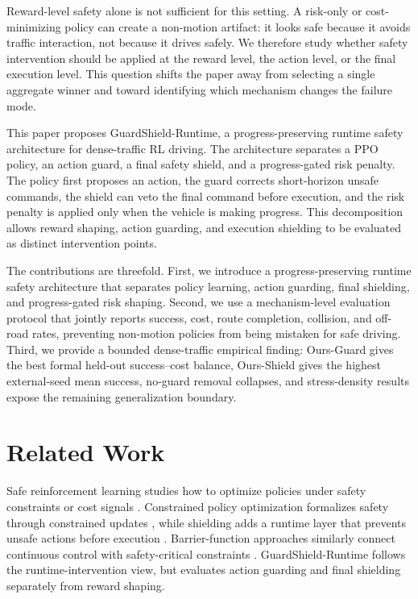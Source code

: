 \documentclass[conference,a4paper]{IEEEtran}
\newcommand{\method}{GuardShield-Runtime}
\begin{document}
Reward-level safety alone is not sufficient for this setting. A risk-only or cost-minimizing policy can create a non-motion artifact: it looks safe because it avoids traffic interaction, not because it drives safely. We therefore study whether safety intervention should be applied at the reward level, the action level, or the final execution level. This question shifts the paper away from selecting a single aggregate winner and toward identifying which mechanism changes the failure mode.

This paper proposes \method{}, a progress-preserving runtime safety architecture for dense-traffic RL driving. The architecture separates a PPO policy, an action guard, a final safety shield, and a progress-gated risk penalty. The policy first proposes an action, the guard corrects short-horizon unsafe commands, the shield can veto the final command before execution, and the risk penalty is applied only when the vehicle is making progress. This decomposition allows reward shaping, action guarding, and execution shielding to be evaluated as distinct intervention points.

The contributions are threefold. First, we introduce a progress-preserving runtime safety architecture that separates policy learning, action guarding, final shielding, and progress-gated risk shaping. Second, we use a mechanism-level evaluation protocol that jointly reports success, cost, route completion, collision, and off-road rates, preventing non-motion policies from being mistaken for safe driving. Third, we provide a bounded dense-traffic empirical finding: Ours-Guard gives the best formal held-out success--cost balance, Ours-Shield gives the highest external-seed mean success, no-guard removal collapses, and stress-density results expose the remaining generalization boundary.

\section{Related Work}
Safe reinforcement learning studies how to optimize policies under safety constraints or cost signals \cite{garcia2015safe,sutton2018reinforcement}. Constrained policy optimization formalizes safety through constrained updates \cite{achiam2017cpo}, while shielding adds a runtime layer that prevents unsafe actions before execution \cite{alshiekh2018safe}. Barrier-function approaches similarly connect continuous control with safety-critical constraints \cite{cheng2019end}. \method{} follows the runtime-intervention view, but evaluates action guarding and final shielding separately from reward shaping.
\end{document}
